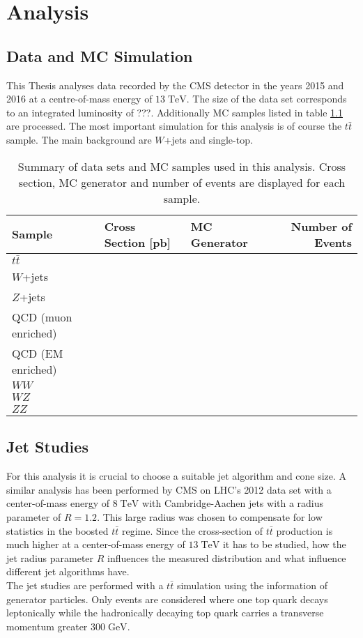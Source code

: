 \chapter{Analysis}
\section{Data and MC Simulation}
	This Thesis analyses data recorded by the CMS detector in the years 2015 and 2016 at a centre-of-mass energy of $13\;\text{TeV}$. The size of the data set corresponds to an integrated luminosity of ???. Additionally MC samples listed in table \ref{MC_Tab} are processed. The most important simulation for this analysis is of course the $t\bar{t}$ sample. The main background are $W$+jets and single-top. 
	
	\begin{landscape}
	\begin{table}
	\centering
	 \begin{tabular}{|l|l|l|r|}
	 	\hline
	 	Sample & Cross Section [pb] & MC Generator & Number of Events \\
	 	\hline
	 	$t\bar{t}$ & & & \\
		\hline
	 	$W$+jets & & & \\
	 	$Z$+jets & & & \\
	 	QCD (muon enriched) & & & \\
	 	QCD (EM enriched) & & & \\
	 	$WW$ & & & \\
	 	$WZ$ & & & \\
	 	$ZZ$ & & & \\
	 	 \hline
	 \end{tabular}
	\caption{Summary of data sets and MC samples used in this analysis. Cross section, MC generator and number of events are displayed for each sample.}
	\label{MC_Tab}	
	\end{table}
	\end{landscape}
	
	
\section{Jet Studies}
	For this analysis it is crucial to choose a suitable jet algorithm and cone size. A similar analysis has been performed by CMS on LHC's 2012 data set with a center-of-mass energy of $8\;\text{TeV}$ with Cambridge-Aachen jets with a radius parameter of $R=1.2$. This large radius was chosen to compensate for low statistics in the boosted $t\bar{t}$ regime. Since the cross-section of $t\bar{t}$ production is much higher at a center-of-mass energy of $13\;\text{TeV}$ it has to be studied, how the jet radius parameter $R$ influences the measured distribution and what influence different jet algorithms have.
	\\
	The jet studies are performed with a $t\bar{t}$ simulation using the information of generator particles. Only events are considered where one top quark decays leptonically while the hadronically decaying top quark carries a transverse momentum greater $300\;\text{GeV}$.
